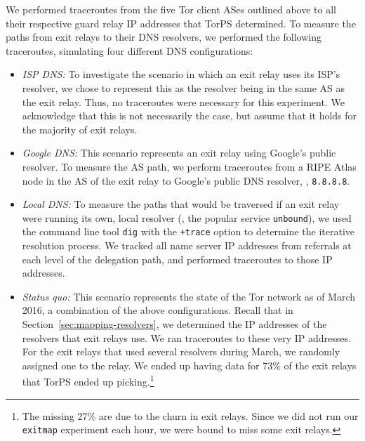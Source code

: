 We performed traceroutes from the five Tor client ASes outlined above to all
their respective guard relay IP addresses that TorPS determined.  To measure the
paths from exit relays to their DNS resolvers, we performed the following
traceroutes, simulating four different DNS configurations:
\begin{itemize}
	\item \emph{ISP DNS:} To investigate the scenario in which an exit relay
		uses its ISP's resolver, we chose to represent this as the resolver
		being in the same AS as the exit relay.  Thus, no traceroutes were
		necessary for this experiment.  We acknowledge that this is not
		necessarily the case, but assume that it holds for the majority of exit
		relays.

	\item \emph{Google DNS:} This scenario represents an exit relay using
		Google's public resolver.  To measure the AS path, we perform
		traceroutes from a RIPE Atlas node in the AS of the exit relay to
		Google's public DNS resolver, \ie, {\tt 8.8.8.8}.

	\item \emph{Local DNS:} To measure the paths that would be traversed if an
		exit relay were running its own, local resolver (\eg, the popular
		service {\tt unbound}), we used the command line tool {\tt dig} with the
		{\tt +trace} option to determine the iterative resolution process.  We
		tracked all name server IP addresses from referrals at each level of the
		delegation path, and performed traceroutes to those IP addresses.

	\item \emph{Status quo:} This scenario represents the state of the Tor
		network as of March 2016, a combination of the above configurations.
		Recall that in Section~\ref{sec:mapping-resolvers}, we determined
		the IP addresses of the resolvers that exit relays use.  We ran
		traceroutes to these very IP addresses.  For the exit relays that used
		several resolvers during March, we randomly assigned one to the relay.
		We ended up having data for 73\% of the exit relays that TorPS ended up
		picking.\footnote{The missing 27\% are due to the churn in exit relays.
		Since we did not run our {\tt exitmap} experiment each hour, we were
		bound to miss some exit relays.}
\end{itemize}

